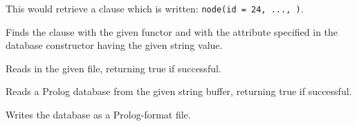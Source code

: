 This would retrieve a clause which is written: {\tt node(id = 24, ..., )}.


Finds the clause with the given functor and with the attribute specified
in the database constructor having the given string value.

\label{wxexprdatabaseread}


Reads in the given file, returning true if successful.

\label{wxexprdatabasereadfromstring}


Reads a Prolog database from the given string buffer, returning true if
successful.

\label{wxexprdatabasewrite}



Writes the database as a Prolog-format file.


